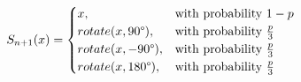\begin{equation}
    \label{eq:mdptransition}
    S_{n+1}(x) = 
    \begin{cases}
        x,& \text{with probability } 1-p\\
        rotate(x, 90\degree),              & \text{with probability } \frac{p}{3}\\
        rotate(x, -90\degree),              & \text{with probability } \frac{p}{3}\\
        rotate(x, 180\degree),              & \text{with probability } \frac{p}{3}
    \end{cases}
\end{equation}